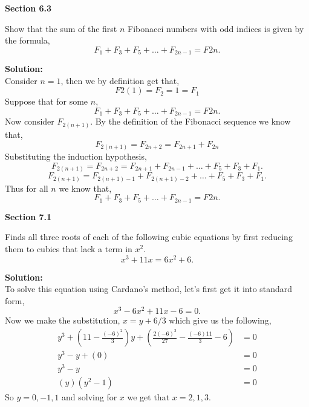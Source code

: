 \documentclass[12pt]{article}
\makeatletter
\theoremstyle{homework}
\newenvironment{exercise}[1]
{\def\@currentlabel{#1}\exercisecore}
{\endexercisecore}
\newcommand{\localhead}[1]{\par\smallskip\noindent\textbf{#1}\nobreak\\}%
\newcommand\solution{\localhead{Solution:}}
\makeatother
\begin{document}
\textbf{Section 6.3}

\begin{exercise}{2.a} Show that the sum of the first $n$ Fibonacci numbers with odd indices is 
  given by the formula, 
  \begin{equation*}
    F_1 + F_3 + F_5 + \dots + F_{2n - 1} = F{2n}.
  \end{equation*}
  \solution Consider $n = 1$, then we by definition get that, 
  \begin{equation*}
    F{2(1)} = F_{2} = 1 = F_{1}
  \end{equation*}
  Suppose that for some $n$,
  \begin{equation*}
    F_1 + F_3 + F_5 + \dots + F_{2n - 1} = F{2n}.
  \end{equation*}
  Now consider $F_{2(n+1)}$. By the definition of the Fibonacci sequence we know that,
  \begin{equation*}
    F_{2(n+1)} = F_{2n+2} = F_{2n + 1} + F_{2n}
  \end{equation*}
  Substituting the induction hypothesis,
  \begin{equation*}
    F_{2(n+1)} = F_{2n+2} = F_{2n + 1} + F_{2n - 1} + \dots + F_5 + F_3 + F_1.
  \end{equation*}
  \begin{equation*}
    F_{2(n+1)} = F_{2(n+1) - 1} + F_{2(n+1) - 2} + \dots + F_5 + F_3 + F_1.
  \end{equation*}
  Thus for all $n$ we know that,
  \begin{equation*}
    F_1 + F_3 + F_5 + \dots + F_{2n - 1} = F{2n}.
  \end{equation*}
\end{exercise}
\vspace{.5in}


\textbf{Section 7.1}

\begin{exercise}{1.a} Finds all three roots of each of the following cubic equations by first reducing them to cubics
  that lack a term in $x^2$.
  \begin{equation*}
    x^3 + 11x = 6x^2 + 6. 
  \end{equation*} 
  \solution To solve this equation using Cardano's method, let's first get it into standard form,
  \begin{equation*}
    x^3 -6x^2 + 11x - 6 = 0. 
  \end{equation*}
  Now we make the substitution, $x = y + 6/3$ which give us the following, 
\begin{align*}
  y^3 + (11 - \frac{(-6)^2}{3})y + (\frac{2(-6)^3}{27} - \frac{(-6)11}{3} - 6) &= 0\\
  y^3  - y + (0) &= 0\\
  y^3  - y &= 0\\
  (y)(y^2  - 1) &= 0
\end{align*}
So $y = 0,-1,1$ and solving for $x$ we get that $x = 2, 1, 3$.
\end{exercise}
\vspace{.5in}
\end{document}
